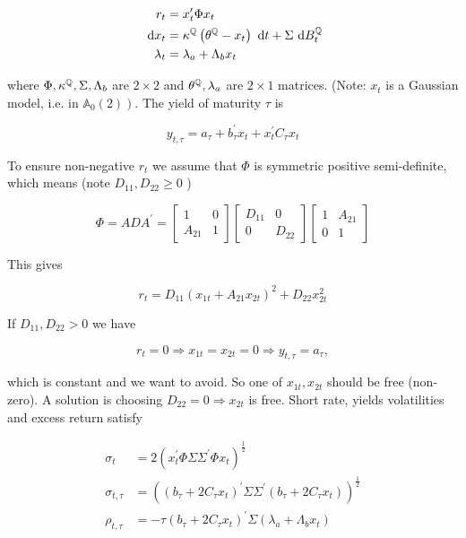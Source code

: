 $$
\begin{aligned}
r_{t} & =x_{t}^{\prime} \Phi x_{t} \\
\text{ d}  x_{t} & =\kappa^{\mathbb{Q}}\left(\theta^{\mathbb{Q}}-x_{t}\right) \text{ d}  t+\Sigma \text{ d}  B_{t}^{\mathbb{Q}} \\
\lambda_{t} & =\lambda_{a}+\Lambda_{b} x_{t}
\end{aligned}
$$

where $\Phi, \kappa^{\mathbb{Q}}, \Sigma, \Lambda_{b}$ are $2 \times 2$ and $\theta^{\mathbb{Q}}, \lambda_{a}$ are $2 \times 1$ matrices. (Note: $x_{t}$ is a Gaussian model, i.e. in $\left.\mathbb{A}_{0}(2)\right)$. The yield of maturity $\tau$ is

$$
y_{t, \tau}=a_{\tau}+b_{\tau}^{\prime} x_{t}+x_{t}^{\prime} C_{\tau} x_{t}
$$

To ensure non-negative $r_{t}$ we assume that $\Phi$ is symmetric positive semi-definite, which means (note $D_{11}, D_{22} \geq 0$ )

$$
\Phi=A D A^{\prime}=\left[\begin{array}{cc}
1 & 0 \\
A_{21} & 1
\end{array}\right]\left[\begin{array}{cc}
D_{11} & 0 \\
0 & D_{22}
\end{array}\right]\left[\begin{array}{cc}
1 & A_{21} \\
0 & 1
\end{array}\right]
$$

This gives

$$
r_{t}=D_{11}\left(x_{1 t}+A_{21} x_{2 t}\right)^{2}+D_{22} x_{2 t}^{2}
$$

If $D_{11}, D_{22}>0$ we have

$$
r_{t}=0 \Longrightarrow x_{1 t}=x_{2 t}=0 \Longrightarrow y_{t, \tau}=a_{\tau},
$$

which is constant and we want to avoid. So one of $x_{1 t}, x_{2 t}$ should be free (non-zero). A solution is choosing $D_{22}=0 \Longrightarrow x_{2 t}$ is free. Short rate, yields volatilities and excess return satisfy

$$
\begin{aligned}
\sigma_{t} & =2\left(x_{t}^{\prime} \Phi \Sigma \Sigma^{\prime} \Phi x_{t}\right)^{\frac{1}{2}} \\
\sigma_{t, \tau} & =\left(\left(b_{\tau}+2 C_{\tau} x_{t}\right)^{\prime} \Sigma \Sigma^{\prime}\left(b_{\tau}+2 C_{\tau} x_{t}\right)\right)^{\frac{1}{2}} \\
\rho_{t, \tau} & =-\tau\left(b_{\tau}+2 C_{\tau} x_{t}\right)^{\prime} \Sigma\left(\lambda_{a}+\Lambda_{b} x_{t}\right)
\end{aligned}
$$

